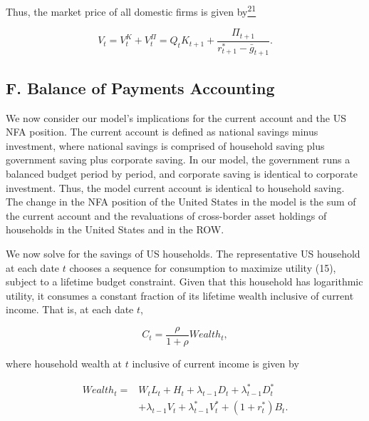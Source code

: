 \documentclass[11pt]{article}
\begin{document}
Thus, the market price of all domestic firms is given by\hyperlink{fn:21}{\textsuperscript{21}}


\setcounter{equation}{18}
\begin{equation}\label{eq:19}
V_t=V_t^K+V_t^{\Pi}=Q_tK_{t+1}+\frac{\Pi_{t+1}}{r_{t+1}^*-\bar g_{t+1}}.
\end{equation}


\subsection*{F. Balance of Payments Accounting}


We now consider our model’s implications for the current account and the US NFA position. The current account is defined as national savings minus investment, where national savings is comprised of household saving plus government saving plus corporate saving. In our model, the government runs a balanced budget period by period, and corporate saving is identical to corporate investment. Thus, the model current account is identical to household saving. The change in the NFA position of the United States in the model is the sum of the current account and the revaluations of cross-border asset holdings of households in the United States and in the ROW.


We now solve for the savings of US households. The representative US household at each date $t$ chooses a sequence for consumption to maximize utility (15), subject to a lifetime budget constraint. Given that this household has logarithmic utility, it consumes a constant fraction of its lifetime wealth inclusive of current income. That is, at each date $t$,


\setcounter{equation}{19}
\begin{equation}\label{eq:20}
C_t=\frac{\rho}{1+\rho}\mathit{Wealth}_t,
\end{equation}


where household wealth at $t$ inclusive of current income is given by


\setcounter{equation}{20}
\begin{equation}\label{eq:21}
\begin{aligned}
\mathit{Wealth}_t={}&W_tL_t+H_t+\lambda_{t-1}D_t+\lambda_{t-1}^*D_t^*\\
&+\lambda_{t-1}V_t+\lambda_{t-1}^*V_t^*+(1+r_t^*)B_t.
\end{aligned}
\end{equation}
\end{document}
